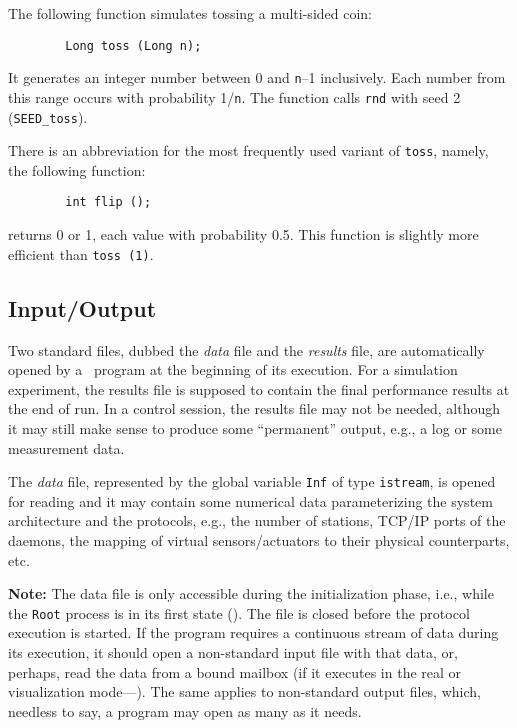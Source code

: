 The following function simulates tossing a multi-sided coin:
\begin{verbatim}
        Long toss (Long n);
\end{verbatim}
It generates an integer number between 0 and {\tt n}--1
inclusively. Each number from this range occurs
with probability 1/{\tt n}. The function calls {\tt rnd} with seed 2
({\tt SEED\_toss}).

There is an abbreviation for the most frequently used variant of {\tt toss},
namely, the following function:
\begin{verbatim}
        int flip ();
\end{verbatim}
returns 0 or 1, each value with probability 0.5.
This function is slightly more efficient than {\tt toss~(1)}.

\subsection{Input/Output}
\label{rm_au_io}

Two standard files, dubbed the {\em data\/} file and the {\em results\/}
file, are automatically opened by a \smurph\ program at the beginning of
its execution.
For a simulation experiment, the results file is supposed to contain the
final performance results at the end of run.
In a control session, the results file may not be needed, although it
may still make sense to produce some ``permanent'' output, e.g., a log or
some measurement data.

The {\em data\/} file, represented by the global variable {\tt Inf}
of type {\tt istream}, is opened for reading and it may contain some
numerical data parameterizing the system architecture and the protocols, e.g.,
the number of stations, TCP/IP ports of the daemons, the mapping of virtual
sensors/actuators to their physical counterparts, etc.

\medskip

\noindent
{\bf Note:}
The data file is only accessible during the initialization phase,
i.e., while the {\tt Root} process is in its first state ().
The file is closed before the protocol execution is started.
If the program requires a continuous stream of data during its execution,
it should open a non-standard input file with that data, or, perhaps, read
the data from a bound mailbox (if it executes in the
real or visualization mode---).
The same applies to non-standard output files, which, needless to say, a
program may open as many as it needs.


